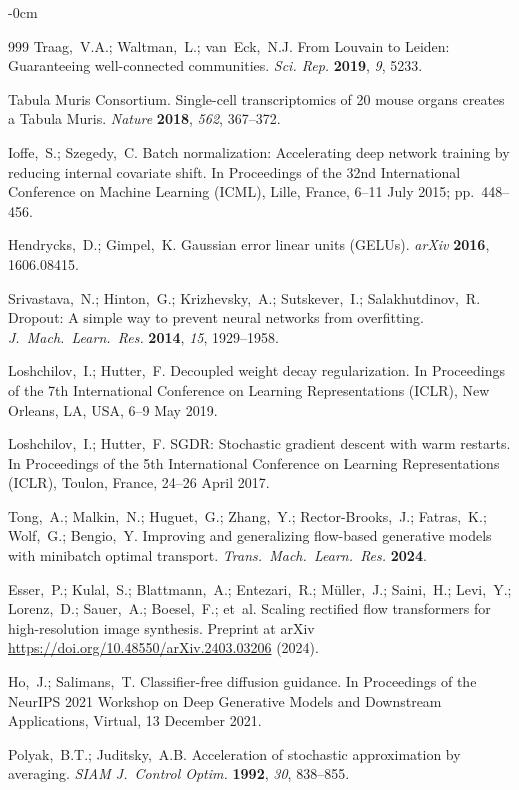 \documentclass[genes,article,submit,pdftex,oneauthor]{Definitions/mdpi}
\begin{document}
\begin{adjustwidth}{-\extralength}{0cm}
\begin{thebibliography}{999}
Traag,~V.A.; Waltman,~L.; van~Eck,~N.J. From Louvain to Leiden: Guaranteeing well-connected communities. {\em Sci. Rep.} {\bf 2019}, {\em 9}, 5233.

Tabula Muris Consortium. Single-cell transcriptomics of 20 mouse organs creates a Tabula Muris. {\em Nature} {\bf 2018}, {\em 562}, 367--372.

Ioffe,~S.; Szegedy,~C. Batch normalization: Accelerating deep network training by reducing internal covariate shift. In Proceedings of the 32nd International Conference on Machine Learning (ICML), Lille, France, 6--11 July 2015; pp.\ 448--456.

Hendrycks,~D.; Gimpel,~K. Gaussian error linear units (GELUs). {\em arXiv} {\bf 2016}, 1606.08415.

Srivastava,~N.; Hinton,~G.; Krizhevsky,~A.; Sutskever,~I.; Salakhutdinov,~R. Dropout: A simple way to prevent neural networks from overfitting. {\em J.\ Mach.\ Learn.\ Res.} {\bf 2014}, {\em 15}, 1929--1958.

Loshchilov,~I.; Hutter,~F. Decoupled weight decay regularization. In Proceedings of the 7th International Conference on Learning Representations (ICLR), New Orleans, LA, USA, 6--9 May 2019.

Loshchilov,~I.; Hutter,~F. SGDR: Stochastic gradient descent with warm restarts. In Proceedings of the 5th International Conference on Learning Representations (ICLR), Toulon, France, 24--26 April 2017.

Tong,~A.; Malkin,~N.; Huguet,~G.; Zhang,~Y.; Rector-Brooks,~J.; Fatras,~K.; Wolf,~G.; Bengio,~Y. Improving and generalizing flow-based generative models with minibatch optimal transport. {\em Trans.\ Mach.\ Learn.\ Res.} {\bf 2024}.

Esser,~P.; Kulal,~S.; Blattmann,~A.; Entezari,~R.; M\"{u}ller,~J.; Saini,~H.; Levi,~Y.; Lorenz,~D.; Sauer,~A.; Boesel,~F.; et~al. Scaling rectified flow transformers for high-resolution image synthesis. Preprint at arXiv \url{https://doi.org/10.48550/arXiv.2403.03206} (2024).

Ho,~J.; Salimans,~T. Classifier-free diffusion guidance. In Proceedings of the NeurIPS 2021 Workshop on Deep Generative Models and Downstream Applications, Virtual, 13 December 2021.

Polyak,~B.T.; Juditsky,~A.B. Acceleration of stochastic approximation by averaging. {\em SIAM J.\ Control Optim.} {\bf 1992}, {\em 30}, 838--855.


\end{thebibliography}
\end{adjustwidth}
\end{document}
